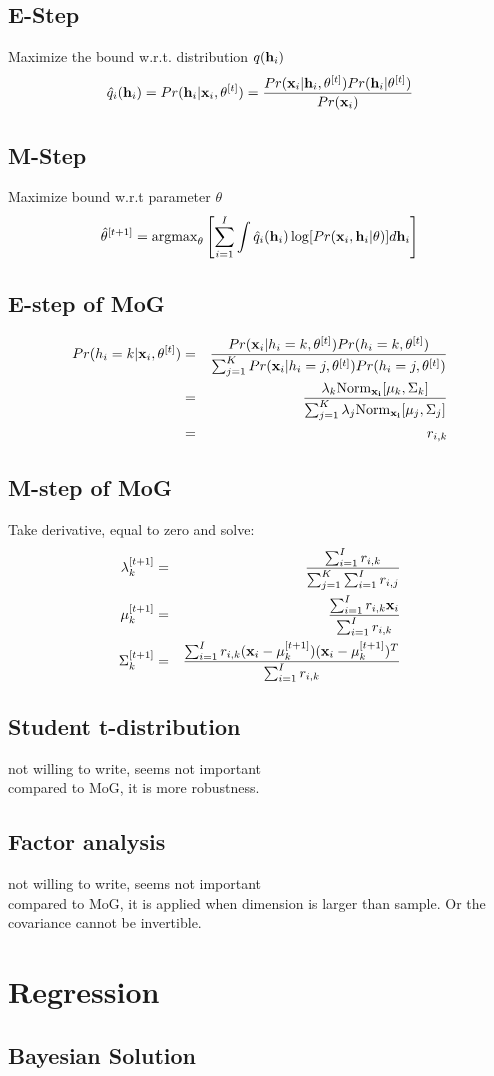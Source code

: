 \documentclass[12pt,a4paper]{article}
\begin{document}
\subsection*{E-Step}
Maximize the bound w.r.t. distribution $q({\bf h}_i)$
$$
\hat q_i({\bf h}_i) = Pr({\bf h}_i|{\bf x}_i,{\bf \theta}^{[t]}) = \frac{ Pr({\bf x}_i|{\bf h}_i,{\bf \theta}^{[t]})Pr({\bf h}_i|\theta^{[t]})}{Pr({\bf x}_i)}
$$
\subsection*{M-Step}
Maximize bound w.r.t parameter $\theta$
$$
\hat \theta^{[t+1]} = {\rm argmax}_{\theta}\left[\sum_{i=1}^{I}\int \hat q_i({\bf h}_i)\log [Pr({\bf x}_i,{\bf h}_i|\theta)] d{\bf h}_i\right]
$$
\subsection*{E-step of MoG}
\begin{eqnarray*}
Pr(h_i=k|{\bf x}_i,\theta^{[t]}) &=& \frac{Pr({\bf x}_i|h_i=k,\theta^{[t]})Pr(h_i=k,\theta^{[t]})}{\sum_{j=1}^{K}Pr({\bf x}_i|h_i=j,\theta^{[t]})Pr(h_i=j,\theta^{[t]})}\\
&=& \frac{\lambda_k {\rm Norm}_{\bf x_i}[\mu_k,\Sigma_k]}{\sum_{j=1}^{K}\lambda_j {\rm Norm}_{\bf x_i}[\mu_j,\Sigma_j]}\\
&=& r_{i,k}
\end{eqnarray*}
\subsection*{M-step of MoG}
Take derivative, equal to zero and solve:
\begin{eqnarray*}
\lambda_k^{[t+1]} &=& \frac{\sum_{i=1}^{I} r_{i,k}}{\sum_{j=1}^{K}\sum_{i=1}^{I}r_{i,j}} \\
\mu_k^{[t+1]} &=& \frac{\sum_{i=1}^{I}r_{i,k}{\bf x}_i}{\sum_{i=1}^{I}r_{i,k}}\\
\Sigma_k^{[t+1]} &=& \frac{\sum_{i=1}^{I}r_{i,k}({\bf x}_i-\mu_k^{[t+1]})({\bf x}_i-\mu_k^{[t+1]})^T}{\sum_{i=1}^{I}r_{i,k}} 
\end{eqnarray*}
\subsection*{Student t-distribution}
not willing to write, seems not important\\
compared to MoG, it is more robustness.
\subsection*{Factor analysis}
not willing to write, seems not important\\
compared to MoG, it is applied when dimension is larger than sample. Or the covariance cannot be invertible.
\section*{Regression}
\subsection*{Bayesian Solution}
\end{document}
